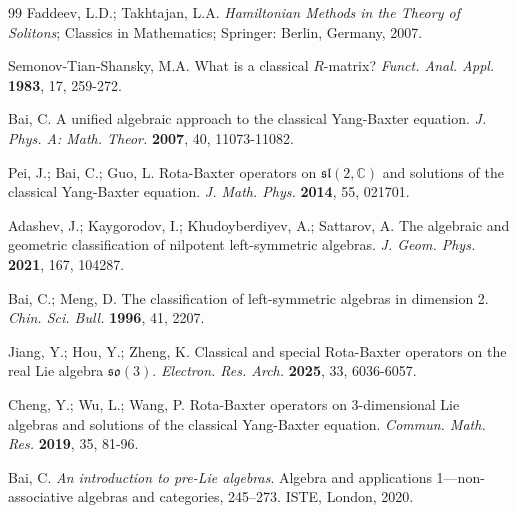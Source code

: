 \documentclass[12pt, reqno]{amsart}
\theoremstyle{plain}
\begin{document}
\begin{thebibliography}{99}
 Faddeev, L.D.; Takhtajan, L.A. \emph{Hamiltonian Methods in the Theory of Solitons}; Classics in Mathematics; Springer: Berlin, Germany, 2007. %

 Semonov-Tian-Shansky, M.A. What is a classical $R$-matrix? \emph{Funct. Anal. Appl.} \textbf{1983}, 17, 259-272.

 Bai, C. A unified algebraic approach to the classical Yang-Baxter equation. \emph{J. Phys. A: Math. Theor.} \textbf{2007}, 40, 11073-11082.

 Pei, J.; Bai, C.; Guo, L. Rota-Baxter operators on $\mathfrak{sl}(2,\mathbb{C})$ and solutions of the classical Yang-Baxter equation. \emph{J. Math. Phys.} \textbf{2014}, 55, 021701.

 Adashev, J.; Kaygorodov, I.; Khudoyberdiyev, A.; Sattarov, A. The algebraic and geometric classification of nilpotent left-symmetric algebras. \emph{J. Geom. Phys.} \textbf{2021}, 167, 104287.

 Bai, C.; Meng, D. The classification of left-symmetric algebras in dimension 2. \emph{Chin. Sci. Bull.} \textbf{1996}, 41, 2207. 

 Jiang, Y.; Hou, Y.; Zheng, K. Classical and special Rota-Baxter operators on the real Lie algebra $\mathfrak{so}(3)$. \emph{Electron. Res. Arch.} \textbf{2025}, 33, 6036-6057.

 Cheng, Y.; Wu, L.; Wang, P. Rota-Baxter operators on 3-dimensional Lie algebras and solutions of the classical Yang-Baxter equation. \emph{Commun. Math. Res.} \textbf{2019}, 35, 81-96.



 Bai, C. \emph{An introduction to pre-Lie algebras}. Algebra and applications 1—non-associative algebras and categories, 245–273. ISTE, London, 2020.




\end{thebibliography}
\end{document}
